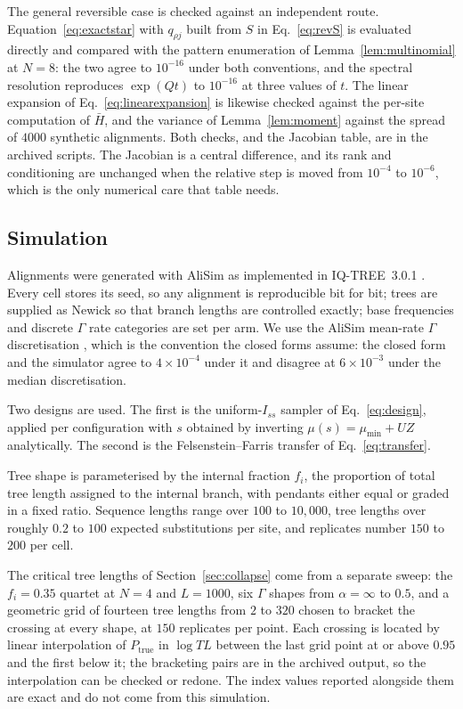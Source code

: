 \documentclass[11pt]{article}
\newcommand{\Iss}{I_{ss}}
\newcommand{\Hbar}{\bar H}
\theoremstyle{definition}
\theoremstyle{remark}
\begin{document}
The general reversible case is checked against an independent route.
Equation~\eqref{eq:exactstar} with $q_{\rho j}$ built from
$S$ in Eq.~\eqref{eq:revS} is evaluated directly and compared with the
pattern enumeration of Lemma~\ref{lem:multinomial} at $N=8$: the two agree
to $10^{-16}$ under both conventions, and the spectral resolution reproduces
$\exp(Qt)$ to $10^{-16}$ at three values of $t$. The linear expansion of
Eq.~\eqref{eq:linearexpansion} is likewise checked against the per-site
computation of $\Hbar$, and the variance of Lemma~\ref{lem:moment} against
the spread of $4000$ synthetic alignments. Both checks, and the Jacobian
table, are in the archived scripts. The Jacobian is a central difference, and
its rank and conditioning are unchanged when the relative step is moved from
$10^{-4}$ to $10^{-6}$, which is the only numerical care that table needs.

\subsection{Simulation}
\label{sec:simulation-methods}

Alignments were generated with AliSim \citep{lytrong2022alisim} as
implemented in IQ-TREE~3.0.1 \citep{minh2020iqtree2}. Every cell stores its
seed, so any alignment is reproducible bit for bit; trees are supplied as
Newick so that branch lengths are controlled exactly; base frequencies and
discrete $\Gamma$ rate categories are set per arm. We use the AliSim
mean-rate $\Gamma$ discretisation \citep{yang1994discretegamma}, which is the
convention the closed forms assume: the closed form and the simulator agree
to $4\times10^{-4}$ under it and disagree at $6\times10^{-3}$ under the median
discretisation.

Two designs are used. The first is the uniform-$\Iss$ sampler of
Eq.~\eqref{eq:design}, applied per configuration with $s$ obtained by
inverting $\mu(s)=\mu_{\min}+UZ$ analytically. The second is the
Felsenstein--Farris transfer of Eq.~\eqref{eq:transfer}.

Tree shape is parameterised by the internal fraction $f_i$, the proportion of
total tree length assigned to the internal branch, with pendants either equal
or graded in a fixed ratio. Sequence lengths range over $100$ to $10{,}000$,
tree lengths over roughly $0.2$ to $100$ expected substitutions per site, and
replicates number $150$ to $200$ per cell.

The critical tree lengths of Section~\ref{sec:collapse} come from a separate
sweep: the $f_i=0.35$ quartet at $N=4$ and $L=1000$, six $\Gamma$ shapes from
$\alpha=\infty$ to $0.5$, and a geometric grid of fourteen tree lengths from
$2$ to $320$ chosen to bracket the crossing at every shape, at $150$
replicates per point. Each crossing is located by linear interpolation of
$P_{\mathrm{true}}$ in $\log TL$ between the last grid point at or above
$0.95$ and the first below it; the bracketing pairs are in the archived
output, so the interpolation can be checked or redone. The index values
reported alongside them are exact and do not come from this simulation.
\end{document}
